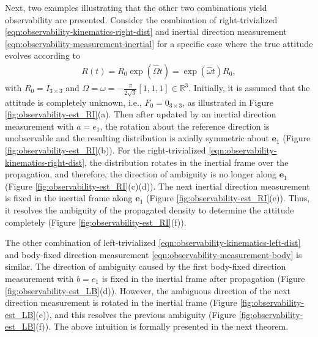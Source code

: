 Next, two examples illustrating that the other two combinations yield observability are presented.
Consider the combination of right-trivialized \eqref{eqn:observability-kinematics-right-dist} and inertial direction measurement \eqref{eqn:observability-measurement-inertial} for a specific case where the true attitude evolves according to
\begin{align}
	R(t) = R_0 \exp(\hat\Omega t) = \exp(\hat\omega t) R_0,\label{eqn:R_est}
\end{align}
with $R_0=I_{3\times 3}$ and $\Omega = \omega = -\frac{\pi}{2\sqrt{3}}[1, 1, 1]\in\mathbb{R}^3$. 
Initially, it is assumed that the attitude is completely unknown, i.e., $F_0 = 0_{3\times 3}$, as illustrated in Figure \ref{fig:observability-est_RI}(a).
Then after updated by an inertial direction measurement with $a = e_1$, the rotation about the reference direction is unobservable and the resulting distribution is axially symmetric about $\mathbf{e}_1$ (Figure \ref{fig:observability-est_RI}(b)).
For the right-trivialized \eqref{eqn:observability-kinematics-right-dist}, the distribution rotates in the inertial frame over the propagation, and therefore, the direction of ambiguity is no longer along $\bm{e}_1$ (Figure \ref{fig:observability-est_RI}(c)(d)).
The next inertial direction measurement is fixed in the inertial frame along $\bm{e}_1$ (Figure \ref{fig:observability-est_RI}(e)).
Thus, it resolves the ambiguity of the propagated density to determine the attitude completely (Figure \ref{fig:observability-est_RI}(f)).

The other combination of left-trivialized \eqref{eqn:observability-kinematics-left-dist} and body-fixed direction measurement \eqref{eqn:observability-measurement-body} is similar.
The direction of ambiguity caused by the first body-fixed direction measurement with $b=e_1$ is fixed in the inertial frame after propagation (Figure  \ref{fig:observability-est_LB}(d)).
However, the ambiguous direction of the next direction measurement is rotated in the inertial frame (Figure \ref{fig:observability-est_LB}(e)), and this resolves the previous ambiguity (Figure \ref{fig:observability-est_LB}(f)).
The above intuition is formally presented in the next theorem.


